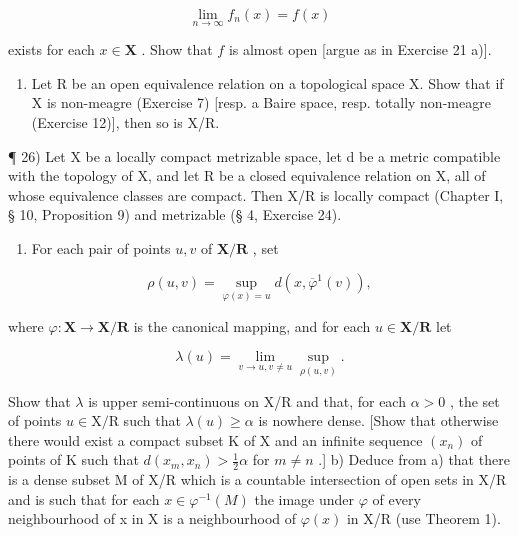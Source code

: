 \[
\lim _ {n \rightarrow \infty} f _ {n} (x) = f (x)
\]

exists for each \(x \in \mathbf{X}\) . Show that \(f\) is almost open {[}argue as in Exercise 21 a){]}.

\begin{enumerate}
\def\labelenumi{\arabic{enumi})}
\setcounter{enumi}{24}
\tightlist
\item
  Let R be an open equivalence relation on a topological space X. Show that if X is non-meagre (Exercise 7) {[}resp. a Baire space, resp. totally non-meagre (Exercise 12){]}, then so is X/R.
\end{enumerate}

¶ 26) Let X be a locally compact metrizable space, let d be a metric compatible with the topology of X, and let R be a closed equivalence relation on X, all of whose equivalence classes are compact. Then X/R is locally compact (Chapter I, § 10, Proposition 9) and metrizable (§ 4, Exercise 24).

\begin{enumerate}
\def\labelenumi{\alph{enumi})}
\tightlist
\item
  For each pair of points \(u, v\) of \(\mathbf{X} / \mathbf{R}\) , set
\end{enumerate}

\[
\rho (u, v) = \sup _ {\varphi (x) = u} d (x, \overline {{\varphi}} ^ {1} (v)),
\]

where \(\varphi : \mathbf{X} \to \mathbf{X} / \mathbf{R}\) is the canonical mapping, and for each \(u \in \mathbf{X} / \mathbf{R}\) let

\[
\lambda (u) = \lim _ {v \rightarrow u, v \neq u} \sup _ {\rho (u, v)}.
\]

Show that \(\lambda\) is upper semi-continuous on X/R and that, for each \(\alpha > 0\) , the set of points \(u \in \mathrm{X} / \mathrm{R}\) such that \(\lambda(u) \geqslant \alpha\) is nowhere dense. {[}Show that otherwise there would exist a compact subset K of X and an infinite sequence \((x_n)\) of points of K such that \(d(x_m, x_n) > \frac{1}{2} \alpha\) for \(m \neq n\) .{]} b) Deduce from a) that there is a dense subset M of X/R which is a countable intersection of open sets in X/R and is such that for each \(x \in \varphi^{-1}(M)\) the image under \(\varphi\) of every neighbourhood of x in X is a neighbourhood of \(\varphi(x)\) in X/R (use Theorem 1).

